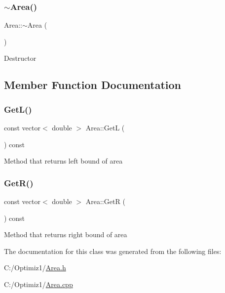\subsubsection{\texorpdfstring{$\sim$\+Area()}{~Area()}}
{\footnotesize\ttfamily Area\+::$\sim$\+Area (\begin{DoxyParamCaption}{ }\end{DoxyParamCaption})\hspace{0.3cm}{\ttfamily [virtual]}}

Destructor 

\subsection{Member Function Documentation}
\mbox{\label{class_area_a0b98386a2a143eee41264b2db59b26b3}} 
\subsubsection{\texorpdfstring{Get\+L()}{GetL()}}
{\footnotesize\ttfamily const vector$<$ double $>$ Area\+::\+GetL (\begin{DoxyParamCaption}{ }\end{DoxyParamCaption}) const}

Method that returns left bound of area \mbox{\label{class_area_a0aeda5ae66e32e7f75bb47bc4886f27a}} 
\subsubsection{\texorpdfstring{Get\+R()}{GetR()}}
{\footnotesize\ttfamily const vector$<$ double $>$ Area\+::\+GetR (\begin{DoxyParamCaption}{ }\end{DoxyParamCaption}) const}

Method that returns right bound of area 

The documentation for this class was generated from the following files\+:\begin{DoxyCompactItemize}
\item 
C\+:/\+Optimiz1/\hyperlink{_area_8h}{Area.\+h}\item 
C\+:/\+Optimiz1/\hyperlink{_area_8cpp}{Area.\+cpp}\end{DoxyCompactItemize}
